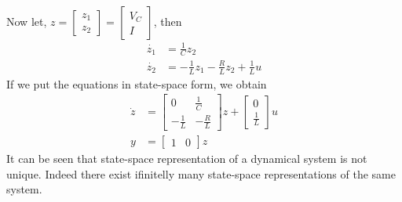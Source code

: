 \documentclass[twoside]{article}
\begin{document}
Now let, $z = \left[ \begin{array}{c} z_1 \\ z_2 \end{array} \right] =
\left[ \begin{array}{c} V_C \\ I \end{array} \right]$, then 
%
\begin{align*}
	\dot{z_1} &= \frac{1}{C} z_2 \\
	\dot{z_2} &= -\frac{1}{L} z_1 - \frac{R}{L} z_2 + \frac{1}{L} u
\end{align*}
%
If we put the equations in state-space form, we obtain
%
\begin{align*}
 \dot{z} &= \left[  \begin{array}{cc} 0 & \frac{1}{C} \\ -\frac{1}{L} &  -\frac{R}{L}  \end{array} \right] z 
 +  \left[  \begin{array}{c} 0 \\ \frac{1}{L} \end{array} \right] u
 \\
 y &= \left[  \begin{array}{cc} 1 & 0 \end{array} \right] z
\end{align*}
%
It can be seen that state-space representation of a dynamical system
is not unique. Indeed there exist ifinitelly many state-space
representations of the same system.
%


\end{document}
